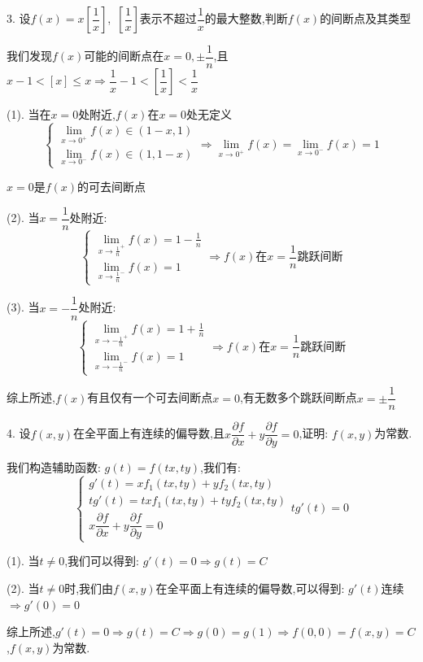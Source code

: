 3. 设$f(x)=x[\dfrac{1}{x}]$,\ $[\dfrac{1}{x}]$表示不超过$\dfrac{1}{x}$的最大整数,判断$f(x)$的间断点及其类型
\begin{solution}

	我们发现$f(x)$可能的间断点在$x=0,\pm \dfrac{1}{n}$,且$x-1<[x]\leq x\Rightarrow \dfrac{1}{x}-1<[\dfrac{1}{x}]<\dfrac{1}{x}$
	
	(1). 当在$x=0$处附近,$f(x)$在$x=0$处无定义
	$$\left\lbrace
	\begin{array}{l}
		\lim\limits_{x\rightarrow 0^{+}}f(x)\in(1-x,1)\\
		\lim\limits_{x\rightarrow 0^{-}}f(x)\in(1,1-x)
	\end{array}
	\right. \Rightarrow \lim\limits_{x\rightarrow 0^{+}}f(x)=\lim\limits_{x\rightarrow 0^{-}}f(x)=1$$
	
	$x=0$是$f(x)$的可去间断点
	
	(2). 当$x=\dfrac{1}{n}$处附近:  
	$$\left\lbrace
	\begin{array}{l}
		\lim\limits_{x\rightarrow \frac{1}{n}^{+}}f(x)=1-\frac{1}{n}\\
		\lim\limits_{x\rightarrow \frac{1}{n}^{-}}f(x)=1
	\end{array}
	\right. \Rightarrow f(x)\text{在}x=\dfrac{1}{n}\text{跳跃间断}$$
	
	(3). 当$x=-\dfrac{1}{n}$处附近:  
	$$\left\lbrace
	\begin{array}{l}
		\lim\limits_{x\rightarrow -\frac{1}{n}^{+}}f(x)=1+\frac{1}{n}\\
		\lim\limits_{x\rightarrow -\frac{1}{n}^{-}}f(x)=1
	\end{array}
	\right. \Rightarrow f(x)\text{在}x=\dfrac{1}{n}\text{跳跃间断}$$
	
	综上所述,$f(x)$有且仅有一个可去间断点$x=0$,有无数多个跳跃间断点$x=\pm \dfrac{1}{n}$
\end{solution}

4. 设$f(x,y)$在全平面上有连续的偏导数,且$x\dfrac{\partial f}{\partial x}+y\dfrac{\partial f}{\partial y}=0$,证明:  $f(x,y)$为常数.
\begin{solution}

	我们构造辅助函数:  $g(t)=f(tx,ty)$,我们有:  
	$$\left\lbrace
	\begin{array}{l}
		g'(t)=xf_{1}(tx,ty)+yf_{2}(tx,ty)\\
		tg'(t)=txf_{1}(tx,ty)+tyf_{2}(tx,ty)\\
		x\dfrac{\partial f}{\partial x}+y\dfrac{\partial f}{\partial y}=0
	\end{array}
	\right. tg'(t)=0$$
	
	(1). 当$t\neq 0$,我们可以得到:  $g'(t)=0\Rightarrow g(t)=C$
	
	(2). 当$t\neq 0$时,我们由$f(x,y)$在全平面上有连续的偏导数,可以得到:  $g'(t)$连续$\Rightarrow g'(0)=0$
	
	综上所述,$g'(t)=0\Rightarrow g(t)=C\Rightarrow g(0)=g(1)\Rightarrow f(0,0)=f(x,y)=C$,$f(x,y)$为常数.
\end{solution}

